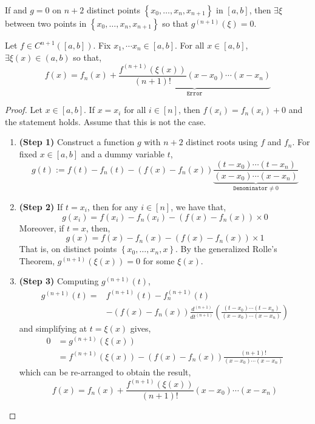 \begin{lem}
    If  and $g = 0$ on $n + 2$ distinct points $\left\{x_0, \ldots, x_n, x_{n+1}\right\}$ in $[a,b]$, then $\exists \xi$ between two points in $\left\{x_0, \ldots, x_n, x_{n+1}\right\}$ so that $g^{(n+1)}(\xi) = 0$.
\end{lem}

\begin{thm}
    Let $f \in C^{n+1}([a,b])$. Fix $x_1, \cdots x_n \in [a,b]$. For all $x \in [a,b]$, $\exists \xi(x) \in(a, b)$ so that,
    \[f(x)=f_n(x)+\underbrace{\frac{f^{(n+1)}(\xi(x))}{(n+1) !}\left(x-x_0\right) \cdots\left(x-x_n\right)}_{\texttt{Error}}\]
\end{thm}

\begin{proof}
    Let $x \in [a,b]$. If $x = x_i$ for all $i \in [n]$, then $f(x_i) = f_n(x_i) + 0$ and the statement holds. Assume that this is not the case.
    \begin{enumerate}
        \item \textbf{(Step 1)} Construct a function $g$ with $n + 2$ distinct roots using $f$ and $f_n$. For fixed $x \in [a,b]$ and a dummy variable $t$,
        \[g(t):=f(t)-f_n(t)-\left(f(x)-f_n(x)\right) \underbrace{\frac{\left(t-x_0\right) \cdots\left(t-x_n\right)}{\left(x-x_0\right) \cdots\left(x-x_n\right)}}_{\texttt {Denominator} \neq 0}\]
        \item \textbf{(Step 2)} If $t = x_i$, then for any $i \in [n]$, we have that,
        \[g\left(x_i\right)=f\left(x_i\right)-f_n\left(x_i\right)-\left(f(x)-f_n(x)\right) \times 0\]
        Moreover, if $t = x$, then,
        \[g(x)=f(x)-f_n(x)-\left(f(x)-f_n(x)\right) \times 1\]
        That is,  on  distinct points $\left\{x_0, \ldots, x_n, x\right\}$. By the generalized Rolle's Theorem, $g^{(n+1)}(\xi(x))=0$ for some $\xi(x)$.
        \item \textbf{(Step 3)} Computing $g^{(n+1)}(t)$,
        \begin{align*}
            g^{(n+1)}(t)=& f^{(n+1)}(t)-f_n^{(n+1)}(t) \\
            &-\left(f(x)-f_n(x)\right) \frac{d^{(n+1)}}{d t^{(n+1)}}\left(\frac{\left(t-x_0\right) \cdots\left(t-x_n\right)}{\left(x-x_0\right) \cdots\left(x-x_n\right)}\right)
            \end{align*}
            and simplifying at $t = \xi(x)$ gives,
            \begin{align*}
                0 &= g^{(n+1)}(\xi(x)) \\
              &=f^{(n+1)}(\xi(x))-\left(f(x)-f_n(x)\right) \frac{(n+1) !}{\left(x-x_0\right) \cdots\left(x-x_n\right)}
            \end{align*}
            which can be re-arranged to obtain the result,
            \[f(x)=f_n(x)+\frac{f^{(n+1)}(\xi(x))}{(n+1) !}\left(x-x_0\right) \cdots\left(x-x_n\right)\]
    \end{enumerate}
\end{proof}

